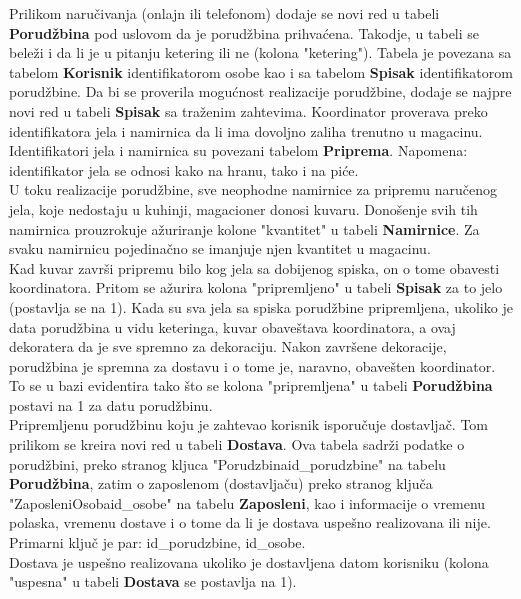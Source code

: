 Prilikom naručivanja (onlajn ili telefonom) dodaje se novi red u tabeli \textbf{Porudžbina} pod uslovom da je porudžbina prihvaćena. Takodje, u tabeli se bele\v zi i da li je u pitanju ketering ili ne (kolona "ketering"). Tabela je povezana sa tabelom \textbf{Korisnik} identifikatorom osobe kao i sa tabelom \textbf{Spisak} identifikatorom porudžbine. Da bi se proverila mogućnost realizacije porudžbine, dodaje se najpre novi red u tabeli \textbf{Spisak} sa traženim zahtevima. Koordinator proverava preko identifikatora jela i namirnica da li ima dovoljno zaliha trenutno u magacinu. Identifikatori jela i namirnica su povezani tabelom \textbf{Priprema}. Napomena: identifikator jela se odnosi kako na hranu, tako i na piće.
\\

U toku realizacije porud\v zbine, sve neophodne namirnice za pripremu naru\v cenog jela, koje nedostaju u kuhinji, magacioner donosi kuvaru. Dono\v senje svih tih namirnica prouzrokuje a\v zuriranje kolone "kvantitet" u tabeli \textbf{Namirnice}. Za svaku namirnicu pojedina\v cno se imanjuje njen kvantitet u magacinu.\\
Kad kuvar zavr\v si pripremu bilo kog jela sa dobijenog spiska, on o tome obavesti koordinatora. Pritom se a\v zurira kolona "pripremljeno" u tabeli \textbf{Spisak} za to jelo (postavlja se na 1). Kada su sva jela sa spiska porud\v zbine pripremljena, ukoliko je data porud\v zbina u vidu keteringa, kuvar obave\v stava koordinatora, a ovaj dekoratera da je sve spremno za dekoraciju. Nakon zavr\v sene dekoracije, porud\v zbina je spremna za dostavu i o tome je, naravno, obave\v sten koordinator. To se u bazi evidentira tako \v sto se kolona "pripremljena" u tabeli \textbf{Porud\v zbina} postavi na 1 za datu porud\v zbinu.\\
Pripremljenu porud\v zbinu koju je zahtevao korisnik isporu\v cuje dostavlja\v c. Tom prilikom se kreira novi red u tabeli \textbf{Dostava}. Ova tabela sadr\v zi podatke o porud\v zbini, preko stranog kljuca "Porudzbinaid\_porudzbine" na tabelu \textbf{Porud\v zbina}, zatim o zaposlenom (dostavlja\v cu) preko stranog klju\v ca "ZaposleniOsobaid\_osobe" na tabelu  \textbf{Zaposleni}, kao i informacije o vremenu polaska, vremenu dostave i o tome da li je dostava uspe\v sno realizovana ili nije. Primarni klju\v c je par: id\_porudzbine, id\_osobe. \\
Dostava je uspe\v sno realizovana ukoliko je dostavljena datom korisniku (kolona "uspesna" u tabeli \textbf{Dostava} se postavlja na 1).\\



